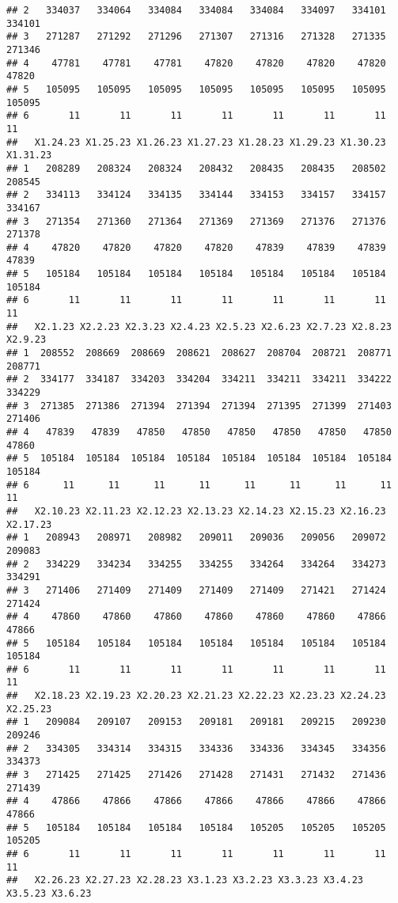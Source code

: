 \documentclass[
]{article}
\begin{document}
\begin{verbatim}
## 2   334037   334064   334084   334084   334084   334097   334101   334101
## 3   271287   271292   271296   271307   271316   271328   271335   271346
## 4    47781    47781    47781    47820    47820    47820    47820    47820
## 5   105095   105095   105095   105095   105095   105095   105095   105095
## 6       11       11       11       11       11       11       11       11
##   X1.24.23 X1.25.23 X1.26.23 X1.27.23 X1.28.23 X1.29.23 X1.30.23 X1.31.23
## 1   208289   208324   208324   208432   208435   208435   208502   208545
## 2   334113   334124   334135   334144   334153   334157   334157   334167
## 3   271354   271360   271364   271369   271369   271376   271376   271378
## 4    47820    47820    47820    47820    47839    47839    47839    47839
## 5   105184   105184   105184   105184   105184   105184   105184   105184
## 6       11       11       11       11       11       11       11       11
##   X2.1.23 X2.2.23 X2.3.23 X2.4.23 X2.5.23 X2.6.23 X2.7.23 X2.8.23 X2.9.23
## 1  208552  208669  208669  208621  208627  208704  208721  208771  208771
## 2  334177  334187  334203  334204  334211  334211  334211  334222  334229
## 3  271385  271386  271394  271394  271394  271395  271399  271403  271406
## 4   47839   47839   47850   47850   47850   47850   47850   47850   47860
## 5  105184  105184  105184  105184  105184  105184  105184  105184  105184
## 6      11      11      11      11      11      11      11      11      11
##   X2.10.23 X2.11.23 X2.12.23 X2.13.23 X2.14.23 X2.15.23 X2.16.23 X2.17.23
## 1   208943   208971   208982   209011   209036   209056   209072   209083
## 2   334229   334234   334255   334255   334264   334264   334273   334291
## 3   271406   271409   271409   271409   271409   271421   271424   271424
## 4    47860    47860    47860    47860    47860    47860    47866    47866
## 5   105184   105184   105184   105184   105184   105184   105184   105184
## 6       11       11       11       11       11       11       11       11
##   X2.18.23 X2.19.23 X2.20.23 X2.21.23 X2.22.23 X2.23.23 X2.24.23 X2.25.23
## 1   209084   209107   209153   209181   209181   209215   209230   209246
## 2   334305   334314   334315   334336   334336   334345   334356   334373
## 3   271425   271425   271426   271428   271431   271432   271436   271439
## 4    47866    47866    47866    47866    47866    47866    47866    47866
## 5   105184   105184   105184   105184   105205   105205   105205   105205
## 6       11       11       11       11       11       11       11       11
##   X2.26.23 X2.27.23 X2.28.23 X3.1.23 X3.2.23 X3.3.23 X3.4.23 X3.5.23 X3.6.23

\end{verbatim}
\end{document}
